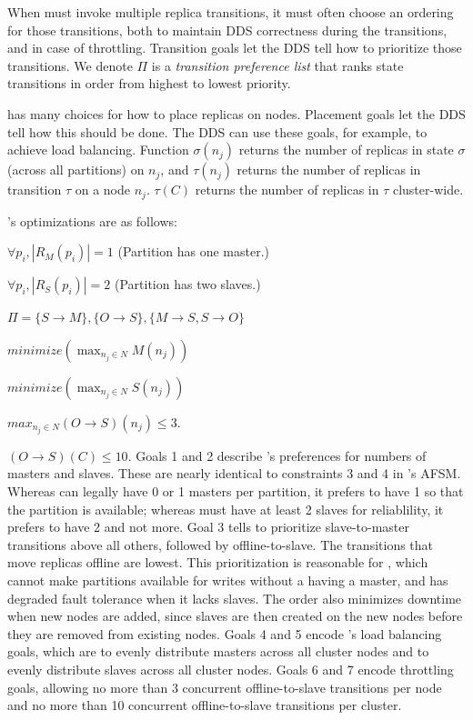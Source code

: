 When \helix must invoke
multiple replica transitions, it must often choose an ordering for those
transitions, both to maintain DDS correctness during the transitions, and in
case of throttling.  Transition goals let the DDS
tell \helix how to prioritize those transitions. 
We denote $\Pi$ is a \emph{transition preference list} that ranks
state transitions in order from highest to lowest priority.  

\helix has many choices for how to place replicas on nodes.  Placement goals let
the DDS tell \helix how this should be done.  The DDS can use these
goals, for example, to achieve load balancing.  
Function $\sigma(n_j)$ returns the number of replicas in state $\sigma$
(across all partitions) on $n_j$, and $\tau(n_j)$ returns the number of
replicas in transition $\tau$ on a node $n_j$.  $\tau(C)$ returns the number of
replicas in $\tau$ cluster-wide.  


\ES's optimizations are as follows:  
\be
\item $\forall p_i, |R_M(p_i)| = 1$  (Partition has one
master.)
\item $\forall p_i, |R_S(p_i)| = 2$  (Partition has two slaves.)   
\item $\Pi=\{S \rightarrow M\}, \{O \rightarrow S\}, \{M \rightarrow S, S
\rightarrow O\}$
\item $minimize(\max_{{n_j} \in N}M(n_j))$
\item $minimize(\max_{{n_j} \in N}S(n_j))$
\item $max_{{n_j} \in N}(O \rightarrow S)(n_j) \le 3$.
\item $(O \rightarrow S)(C) \le 10$.
\ee
Goals 1 and 2 describe \ES's preferences for numbers of masters and
slaves.  These are nearly identical to constraints 3 and 4 in \ES's AFSM.
Whereas \ES can legally have 0 or 1 masters per partition, it prefers to have 1
so that the partition is available; whereas \ES must have at least 2 slaves for
reliablility, it prefers to have 2 and not more.
Goal 3 tells \helix to prioritize slave-to-master transitions above all
others, followed by offline-to-slave.  The transitions that move replicas
offline are lowest.  This prioritization is reasonable for \ES, which cannot
make partitions available for writes without a having a master, and has degraded 
fault tolerance when it lacks slaves.  The order also minimizes downtime when new nodes
are added, since slaves are then created on the new nodes before they are removed
from existing nodes. 
Goals 4 and 5 encode \ES's load
balancing goals, which are to evenly distribute masters across all cluster nodes
and to evenly distribute slaves across all cluster nodes.  Goals 6 and 7 encode
throttling goals, allowing no more than 3 concurrent offline-to-slave transitions per node
and no more than 10 concurrent offline-to-slave transitions per cluster.

